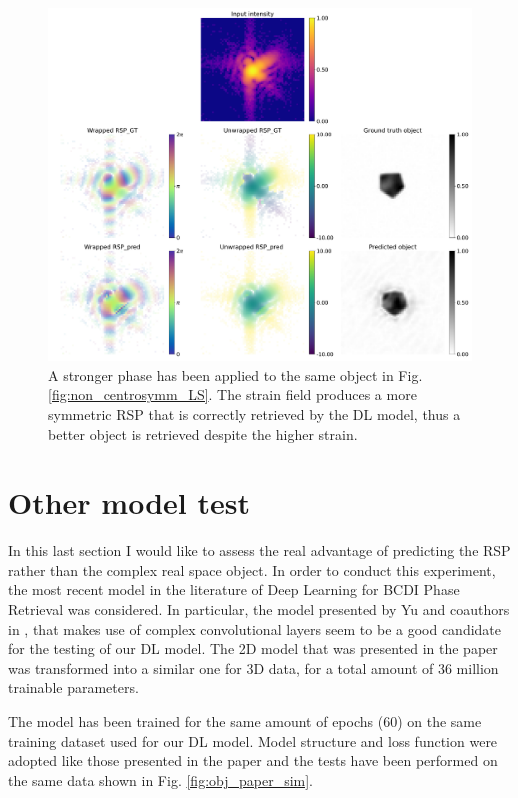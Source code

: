 \begin{figure}[H]
    \centering
    \includegraphics[width=\textwidth]{figures/Phasing/non_centrosymmetric_study_3d_random_HS0.pdf}
    \caption{A stronger phase has been applied to the same object in Fig. \ref{fig:non_centrosymm_LS}. The strain field 
    produces a more symmetric RSP that is correctly retrieved by the DL model, thus a better object is retrieved despite the 
    higher strain. }
    \label{fig:non_centrosymm_HS}
\end{figure}

\section{Other model test}\label{sec:other_model}

In this last section I would like to assess the real advantage of predicting the RSP rather than the complex real space object. 
In order to conduct this experiment, the most recent model in the literature of Deep Learning for BCDI Phase Retrieval was 
considered. In particular, the model presented by Yu and coauthors in \cite{yu_ultrafast_2024}, that makes use of complex 
convolutional layers seem to be a good candidate for the testing of our DL model.
The 2D model that was presented in the paper was transformed into a similar one for 3D data, for a total 
amount of 36 million trainable parameters. 

The model has been trained for the same amount of epochs (60) on the same training dataset used for our DL model. Model structure 
and loss function were adopted like those presented in the paper and the tests have been performed on the same data shown in Fig. \ref{fig:obj_paper_sim}. 

